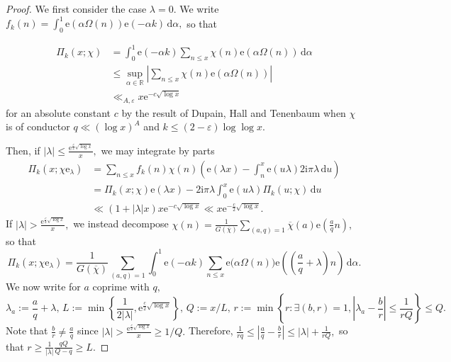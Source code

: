 \documentclass{article}
\newcommand{\e}{\mathrm{e}}
\newcommand{\de}{\,\mathrm{d}}
\newcommand{\ii}{\mathrm{i}}
\newcommand{\R}{\mathds{R}}
\newcommand{\eps}{\varepsilon}
\begin{document}
\begin{proof} 
    We first consider the case $\lambda = 0$. We write $f_k(n) = \int_0^1 \e(\alpha \Omega(n)) \e(-\alpha k) \de\alpha,$ so that

    \begin{align*}
        \Pi_k(x; \chi) &= \int_0^1 \e(-\alpha k) \sum_{n\le x} \chi(n)\e(\alpha \Omega(n)) \de\alpha
        \\&\le \sup_{\alpha \in\R} \left|\sum_{n\le x} \chi(n)\e(\alpha \Omega(n))\right| 
        \\&\ll_{A,\eps} x\e^{-c\sqrt{\log x}}
    \end{align*}
    for an absolute constant $c$ by the result of Dupain, Hall and Tenenbaum \cite[Lemma 2]{dht} when $\chi$ is of conductor $q \ll (\log x)^A$ and $k\le (2-\eps)\log\log x.$

    Then, if $|\lambda| \le \frac{\e^{\frac{c}{2}\sqrt{\log x}}}{x},$ we may integrate by parts
    \begin{align*}
        \Pi_k(x;\chi\e_\lambda) &= \sum_{n\le x} f_k(n) \chi(n) \left(\e(\lambda x)- \int_n^x \e(u\lambda) 2\ii\pi\lambda \de u\right)
        \\&= \Pi_k(x; \chi) \e(\lambda x) - 2\ii\pi\lambda \int_0^x \e(u\lambda) \Pi_k(u; \chi) \de u
        \\&\ll (1+|\lambda| x) x\e^{-c\sqrt{\log x}} \ll x\e^{-\frac{c}{2}\sqrt{\log x}}.
    \end{align*}
    If $|\lambda| > \frac{\e^{\frac{c}{2}\sqrt{\log x}}}{x},$ we instead decompose $\chi(n) = \frac{1}{G(\overline\chi)}\sum_{(a,q) = 1} \overline{\chi}(a) \e\left(\frac{a}{q}n\right),$ so that
    \begin{equation}\label{step45}
        \Pi_k(x;\chi\e_\lambda) = \frac{1}{G(\overline\chi)}\sum_{(a,q) = 1} \int_0^1 \e(-\alpha k) \sum_{n\le x} \e\big(\alpha \Omega(n)\big) \e\left(\left(\frac{a}{q}+\lambda\right)n\right) \de \alpha.
    \end{equation}
    We now write for $a$ coprime with $q,$ $$\lambda_a := \frac{a}{q}+\lambda,\, L := \min\left\{\frac{1}{2|\lambda|}, \e^{\frac{c}{2}\sqrt{\log x}}\right\},\, Q := x/L,\, r := \min\left\{r: \exists(b,r) = 1, \left|\lambda_a - \frac{b}{r}\right| \le \frac{1}{rQ}\right\} \le Q.$$ 
    Note that $\frac{b}{r}\ne \frac{a}{q}$ since $|\lambda| > \frac{\e^{\frac{c}{2}\sqrt{\log x}}}{x}\ge 1/Q.$ Therefore, $\frac{1}{rq} \le \left|\frac{a}{q}- \frac{b}{r}\right| \le |\lambda| + \frac{1}{rQ},$ so that $r \ge \frac{1}{|\lambda|}\frac{qQ}{Q-q} \ge L.$ 
    

\end{proof}
\end{document}
